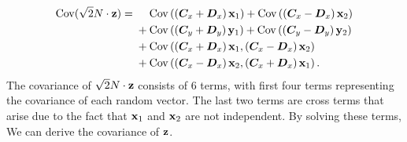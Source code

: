 \begin{equation}
\begin{split}
    \mathrm{Cov}(\sqrt{2}N\cdot\mathbf{z}) = {}& {} \phantom{\,\;\;\,\,\,} \mathrm{Cov}\left(\left({\bm{C}}_x+{\bm{D}}_x\right)\mathbf{x}_1\right)
    +\mathrm{Cov}\left(\left({\bm{C}}_x-{\bm{D}}_x\right)\mathbf{x}_2\right)\\
    &+\mathrm{Cov}\left(\left({\bm{C}}_y+{\bm{D}}_y\right)\mathbf{y}_1\right)
    +\mathrm{Cov}\left(\left({\bm{C}}_y-{\bm{D}}_y\right)\mathbf{y}_2\right)\\
    &+\mathrm{Cov}\left(\left({\bm{C}}_x+{\bm{D}}_x\right)\mathbf{x}_1,\left({\bm{C}}_x-{\bm{D}}_x\right)\mathbf{x}_2\right)\\
    &+\mathrm{Cov}\left(\left({\bm{C}}_x-{\bm{D}}_x\right)\mathbf{x}_2,\left({\bm{C}}_x+{\bm{D}}_x\right)\mathbf{x}_1\right).
\end{split}
\end{equation}
The covariance of $\sqrt{2}N\cdot\mathbf{z}$ consists of 6 terms, with first four terms representing the covariance of each random vector. The last two terms are cross terms that arise due to the fact that $\mathbf{x}_1$ and $\mathbf{x}_2$ are not independent. 
By solving these terms, We can derive the covariance of $\mathbf{z}$.

